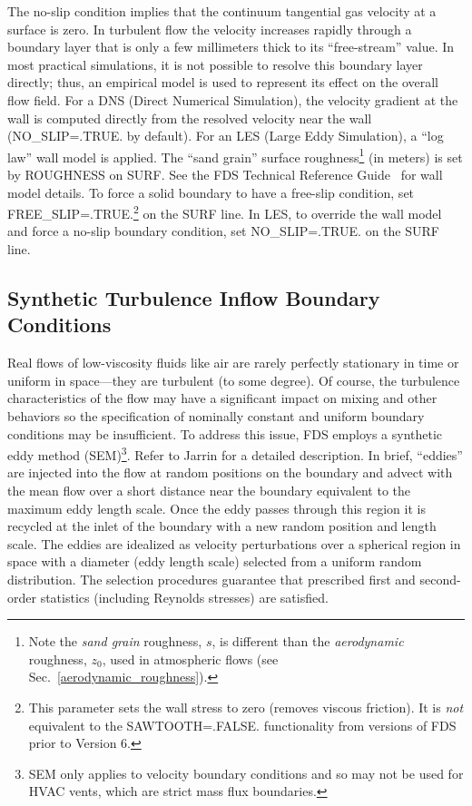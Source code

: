 \documentclass[11pt]{book}
\begin{document}
The no-slip condition implies that the continuum tangential gas velocity at a surface is zero. In turbulent flow the velocity increases rapidly through a boundary layer that is only a few millimeters thick to its ``free-stream'' value. In most practical simulations, it is not possible to resolve this boundary layer directly; thus, an empirical model is used to represent its effect on the overall flow field. For a DNS (Direct Numerical Simulation), the velocity gradient at the wall is computed directly from the resolved velocity near the wall ({\ct NO\_SLIP=.TRUE.} by default). For an LES (Large Eddy Simulation), a ``log law'' wall model is applied. The ``sand grain'' surface roughness\footnote{Note the \emph{sand grain} roughness, $s$, is different than the \emph{aerodynamic} roughness, $z_0$, used in atmospheric flows (see Sec.~\ref{aerodynamic_roughness}).} (in meters) is set by {\ct ROUGHNESS} on {\ct SURF}. See the FDS Technical Reference Guide~\cite{FDS_Math_Guide} for wall model details. To force a solid boundary to have a free-slip condition, set {\ct FREE\_SLIP=.TRUE.}\footnote{This parameter sets the wall stress to zero (removes viscous friction).  It is \emph{not} equivalent to the {\ct SAWTOOTH=.FALSE.} functionality from versions of FDS prior to Version 6.} on the {\ct SURF} line. In LES, to override the wall model and force a no-slip boundary condition, set {\ct NO\_SLIP=.TRUE.} on the {\ct SURF} line.


\subsection{Synthetic Turbulence Inflow Boundary Conditions}
\label{info:synthetic_turbulence}

Real flows of low-viscosity fluids like air are rarely perfectly stationary in time or uniform in space---they are turbulent (to some degree). Of course, the turbulence characteristics of the flow may have a significant impact on mixing and other behaviors so the specification of nominally constant and uniform boundary conditions may be insufficient.  To address this issue, FDS employs a synthetic eddy method (SEM)\footnote{SEM only applies to velocity boundary conditions and so may not be used for HVAC vents, which are strict mass flux boundaries.}.  Refer to Jarrin \cite{Jarrin:2008} for a detailed description. In brief, ``eddies'' are injected into the flow at random positions on the boundary and advect with the mean flow over a short distance near the boundary equivalent to the maximum eddy length scale.  Once the eddy passes through this region it is recycled at the inlet of the boundary with a new random position and length scale. The eddies are idealized as velocity perturbations over a spherical region in space with a diameter (eddy length scale) selected from a uniform random distribution. The selection procedures guarantee that prescribed first and second-order statistics (including Reynolds stresses) are satisfied.
\end{document}

